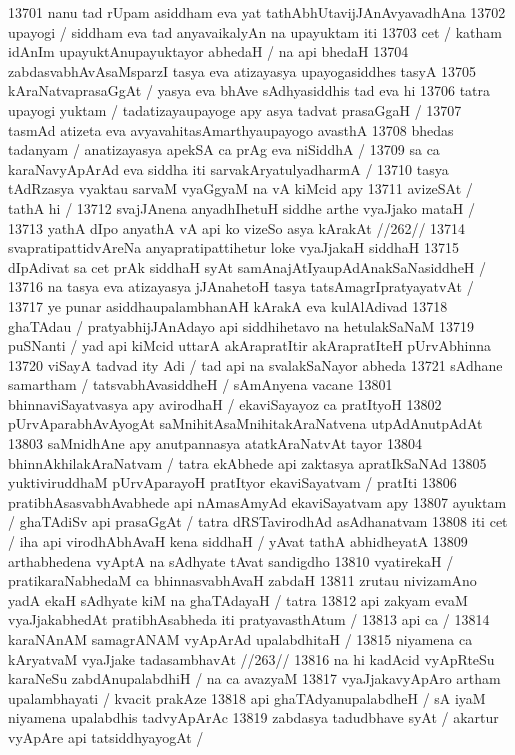 13701 nanu tad rUpam asiddham eva yat tathAbhUtavijJAnAvyavadhAna
13702 upayogi / siddham eva tad anyavaikalyAn na upayuktam iti 
13703 cet / katham idAnIm upayuktAnupayuktayor abhedaH / na api bhedaH
13704 zabdasvabhAvAsaMsparzI tasya eva atizayasya upayogasiddhes tasyA
13705 kAraNatvaprasaGgAt / yasya eva bhAve sAdhyasiddhis tad eva hi 
13706 tatra upayogi yuktam / tadatizayaupayoge apy asya tadvat prasaGgaH / 
13707 tasmAd atizeta eva avyavahitasAmarthyaupayogo avasthA
13708 bhedas tadanyam / anatizayasya apekSA ca prAg eva niSiddhA / 
13709 sa ca karaNavyApArAd eva siddha iti sarvakAryatulyadharmA /
13710 tasya tAdRzasya vyaktau sarvaM vyaGgyaM na vA kiMcid apy 
13711 avizeSAt / tathA hi /
13712 	svajJAnena anyadhIhetuH siddhe arthe vyaJjako mataH /  
13713 	yathA dIpo anyathA vA api ko vizeSo asya kArakAt //262// 
13714 svapratipattidvAreNa anyapratipattihetur loke vyaJjakaH siddhaH
13715 dIpAdivat sa cet prAk siddhaH syAt samAnajAtIyaupAdAnakSaNasiddheH /
13716 na tasya eva atizayasya jJAnahetoH tasya tatsAmagrIpratyayatvAt /  
13717 ye punar asiddhaupalambhanAH kArakA eva kulAlAdivad  
13718 ghaTAdau / pratyabhijJAnAdayo api siddhihetavo na hetulakSaNaM
13719 puSNanti / yad api kiMcid uttarA akArapratItir akArapratIteH pUrvAbhinna
13720 viSayA tadvad ity Adi / tad api na svalakSaNayor abheda 
13721 sAdhane samartham / tatsvabhAvasiddheH / sAmAnyena vacane  
13801 bhinnaviSayatvasya apy avirodhaH / ekaviSayayoz ca pratItyoH  
13802 pUrvAparabhAvAyogAt saMnihitAsaMnihitakAraNatvena utpAdAnutpAdAt
13803 saMnidhAne apy anutpannasya atatkAraNatvAt tayor 
13804 bhinnAkhilakAraNatvam / tatra ekAbhede api zaktasya apratIkSaNAd  
13805 yuktiviruddhaM pUrvAparayoH pratItyor ekaviSayatvam / pratIti
13806 pratibhAsasvabhAvabhede api nAmasAmyAd ekaviSayatvam apy
13807 ayuktam / ghaTAdiSv api prasaGgAt / tatra dRSTavirodhAd asAdhanatvam
13808 iti cet / iha api virodhAbhAvaH kena siddhaH / yAvat tathA abhidheyatA
13809 arthabhedena vyAptA na sAdhyate tAvat sandigdho 
13810 vyatirekaH / pratikaraNabhedaM ca bhinnasvabhAvaH zabdaH
13811 zrutau nivizamAno yadA ekaH sAdhyate kiM na ghaTAdayaH / tatra
13812 api zakyam evaM vyaJjakabhedAt pratibhAsabheda iti pratyavasthAtum / 
13813 api ca /
13814 	karaNAnAM samagrANAM vyApArAd upalabdhitaH /
13815 	niyamena ca kAryatvaM vyaJjake tadasambhavAt //263//  
13816 na hi kadAcid vyApRteSu karaNeSu zabdAnupalabdhiH / na ca avazyaM  
13817 vyaJjakavyApAro artham upalambhayati / kvacit prakAze  
13818 api ghaTAdyanupalabdheH / sA iyaM niyamena upalabdhis  tadvyApArAc
13819 zabdasya tadudbhave syAt / akartur vyApAre api tatsiddhyayogAt /

